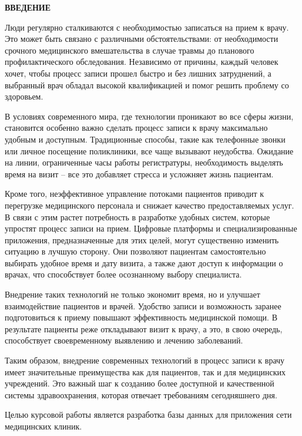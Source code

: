 \begin{center}
	\textbf{\large ВВЕДЕНИЕ}
\end{center}

Люди регулярно сталкиваются с необходимостью записаться на прием к врачу.
Это может быть связано с различными обстоятельствами: от необходимости срочного медицинского вмешательства в случае травмы до планового профилактического обследования. 
Независимо от причины, каждый человек хочет, чтобы процесс записи прошел быстро и без лишних затруднений, а выбранный врач обладал высокой квалификацией и помог решить проблему со здоровьем.

В условиях современного мира, где технологии проникают во все сферы жизни, становится особенно важно сделать процесс записи к врачу максимально удобным и доступным.
Традиционные способы, такие как телефонные звонки или личное посещение поликлиники, все чаще вызывают неудобства. 
Ожидание на линии, ограниченные часы работы регистратуры, необходимость выделять время на визит -- все это добавляет стресса и усложняет жизнь пациентам.

Кроме того, неэффективное управление потоками пациентов приводит к перегрузке медицинского персонала и снижает качество предоставляемых услуг. 
В связи с этим растет потребность в разработке удобных систем, которые упростят процесс записи на прием. 
Цифровые платформы и специализированные приложения, предназначенные для этих целей, могут существенно изменить ситуацию в лучшую сторону. 
Они позволяют пациентам самостоятельно выбирать удобное время и дату визита, а также дают доступ к информации о врачах, что способствует более осознанному выбору специалиста.

Внедрение таких технологий не только экономит время, но и улучшает взаимодействие пациентов и врачей. 
Удобство записи и возможность заранее подготовиться к приему повышают эффективность медицинской помощи. 
В результате пациенты реже откладывают визит к врачу, а это, в свою очередь, способствует своевременному выявлению и лечению заболеваний.

Таким образом, внедрение современных технологий в процесс записи к врачу имеет значительные преимущества как для пациентов, так и для медицинских учреждений. 
Это важный шаг к созданию более доступной и качественной системы здравоохранения, которая отвечает требованиям сегодняшнего дня.

\clearpage
Целью курсовой работы является разработка базы данных для приложения сети медицинских клиник. 

